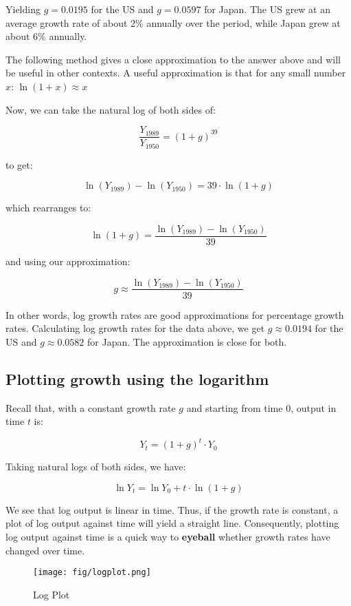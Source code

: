 Yielding \(g = 0.0195\) for the US and \(g = 0.0597\) for Japan. The US grew at an average growth rate of about 2\% annually over the period, while Japan grew at about 6\% annually.

The following method gives a close approximation to the answer above and will be useful in other contexts. A useful approximation is that for any small number \(x\): \(\ln (1 + x) \approx x\)

Now, we can take the natural log of both sides of:

\[
\frac{Y_{1989}}{Y_{1950}} = (1 + g)^{39}
\]

to get:

\[
\ln (Y_{1989}) - \ln (Y_{1950}) = 39 \cdot \ln (1 + g)
\]

which rearranges to:

\[
\ln (1 + g) = \frac{\ln (Y_{1989}) - \ln (Y_{1950})}{39}
\]

and using our approximation:

\[
g \approx \frac{\ln (Y_{1989}) - \ln (Y_{1950})}{39}
\]

In other words, log growth rates are good approximations for percentage growth rates. Calculating log growth rates for the data above, we get \(g \approx 0.0194\) for the US and \(g \approx 0.0582\) for Japan. The approximation is close for both.

\subsection*{Plotting growth using the logarithm}\label{plotting-growth-using-the-logarithm}

Recall that, with a constant growth rate \(g\) and starting from time 0, output in time \(t\) is:

\[Y_t = (1 + g)^t \cdot Y_0\]

Taking natural logs of both sides, we have:

\[\ln Y_t = \ln Y_0 + t \cdot \ln (1 + g)\]

We see that log output is linear in time. Thus, if the growth rate is constant, a plot of log output against time will yield a straight line. Consequently, plotting log output against time is a quick way to \textbf{eyeball} whether growth rates have changed over time.

\begin{figure}
	\centering
	\texttt{[image: fig/logplot.png]}
	\caption{\label{fig:logplot} Log Plot}
\end{figure}

